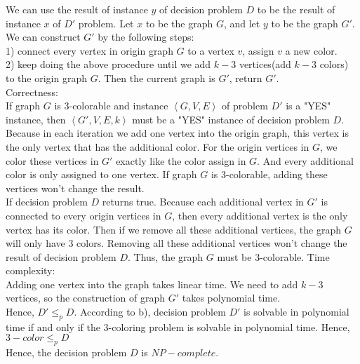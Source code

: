 \documentclass[12pt,letterpaper]{article}
\begin{document}
We can use the result of instance $y$ of decision problem $D$ to be the result of instance $x$ of $D'$ problem.
Let $x$ to be the graph $G$, and let $y$ to be the graph $G'$.
We can construct $G'$ by the following steps: \\
1) connect every vertex in origin graph $G$ to a vertex $v$, assign $v$ a new color. \\
2) keep doing the above procedure until we add $k-3$ vertices(add $k-3$ colors) to the origin graph $G$.
Then the current graph is $G'$, return $G'$. \\
Correctness: \\
If graph $G$ is 3-colorable and instance $\left \langle G, V, E \right \rangle$ of problem $D'$ is a "YES" instance,
then $\left \langle G', V, E, k \right \rangle$ must be a "YES" instance of decision problem $D$.
Because in each iteration we add one vertex into the origin graph, this vertex is the only vertex that has the additional color.
For the origin vertices in $G$, we color these vertices in $G'$ exactly like the color assign in $G$.
And every additional color is only assigned to one vertex.
If graph $G$ is 3-colorable, adding these vertices won't change the result. \\
If decision problem $D$ returns true.
Because each additional vertex in $G'$ is connected to every origin vertices in $G$,
then every additional vertex is the only vertex has its color.
Then if we remove all these additional vertices, the graph $G$ will only have 3 colors.
Removing all these additional vertices won't change the result of decision problem $D$.
Thus, the graph $G$ must be 3-colorable.
Time complexity: \\
Adding one vertex into the graph takes linear time.
We need to add $k-3$ vertices, so the construction of graph $G'$ takes polynomial time. \\
Hence, $D' \le_{p} D$.
According to b), decision problem $D'$ is solvable in polynomial time if and only if the 3-coloring problem is solvable in polynomial time.
Hence, $3-color \le_{p} D$ \\
Hence, the decision problem $D$ is $NP-complete$.
\end{document}
